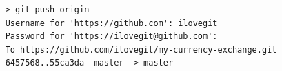 




\begin{verbatim}
    > git push origin 
    Username for 'https://github.com': ilovegit
    Password for 'https://ilovegit@github.com':
    To https://github.com/ilovegit/my-currency-exchange.git
    6457568..55ca3da  master -> master
\end{verbatim}

